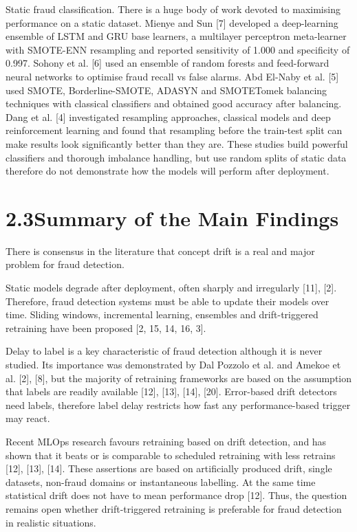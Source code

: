\documentclass[11pt,letterpaper]{report}
\begin{document}
Static fraud classification. There is a huge body of work devoted to maximising performance on a static dataset. Mienye and Sun [7] developed a deep-learning ensemble of LSTM and GRU base learners, a multilayer perceptron meta-learner with SMOTE-ENN resampling and reported sensitivity of 1.000 and specificity of 0.997. Sohony et al. [6] used an ensemble of random forests and feed-forward neural networks to optimise fraud recall vs false alarms. Abd El-Naby et al. [5] used SMOTE, Borderline-SMOTE, ADASYN and SMOTETomek balancing techniques with classical classifiers and obtained good accuracy after balancing. Dang et al. [4] investigated resampling approaches, classical models and deep reinforcement learning and found that resampling before the train-test split can make results look significantly better than they are. These studies build powerful classifiers and thorough imbalance handling, but use random splits of static data therefore do not demonstrate how the models will perform after deployment.

\section*{2.3\quad Summary of the Main Findings}

There is consensus in the literature that concept drift is a real and major problem for fraud detection.

Static models degrade after deployment, often sharply and irregularly [11], [2]. Therefore, fraud detection systems must be able to update their models over time. Sliding windows, incremental learning, ensembles and drift-triggered retraining have been proposed [2, 15, 14, 16, 3].

Delay to label is a key characteristic of fraud detection although it is never studied. Its importance was demonstrated by Dal Pozzolo et al. and Amekoe et al. [2], [8], but the majority of retraining frameworks are based on the assumption that labels are readily available [12], [13], [14], [20]. Error-based drift detectors need labels, therefore label delay restricts how fast any performance-based trigger may react.

Recent MLOps research favours retraining based on drift detection, and has shown that it beats or is comparable to scheduled retraining with less retrains [12], [13], [14]. These assertions are based on artificially produced drift, single datasets, non-fraud domains or instantaneous labelling. At the same time statistical drift does not have to mean performance drop [12]. Thus, the question remains open whether drift-triggered retraining is preferable for fraud detection in realistic situations.
\end{document}
